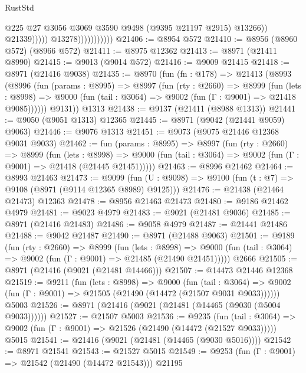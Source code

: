 \begin{lexlean}{RustStd}
\begin{coremodule}
                                        @225
                                        @27
                                        @3056
                                        @3069
                                        @3590
                                        @9498
                                        (@9395 @21197 @2915)
                                        @13266))
                                    @21339)))))
                          @13278)))))))))))
@21406 := @8954 @572
@21410 := @8956 (@8960 @572) (@8966 @572)
@21411 := @8975 @12362
@21413 := @8971 (@21411 @8990)
@21415 := @9013 (@9014 @572)
@21416 := @9009 @21415
@21418 := @8971 (@21416 @9038)
@21435 := @8970
    (fun (fn : @178) =>
    @21413
      (@8993
        (@8996
          (fun (params : @8995) =>
          @8997
            (fun (rty : @2660) =>
            @8999
              (fun (lets : @8998) =>
              @9000 (fun (tail : @3064) => @9002 (fun (Γ : @9001) => @21418 @9085))))))
        @9131))
    @1313
@21438 := @9137 (@21411 (@8988 @1313))
@21441 := @9050 (@9051 @1313) @12365
@21445 := @8971 (@9042 (@21441 @9059) @9063)
@21446 := @9076 @1313
@21451 := @9073 (@9075 @21446 @12368 @9031 @9033)
@21462 := fun (params : @8995) =>
  @8997
    (fun (rty : @2660) =>
    @8999
      (fun (lets : @8998) =>
      @9000 (fun (tail : @3064) => @9002 (fun (Γ : @9001) => @21418 (@21445 @21451)))))
@21463 := @8996 @21462
@21464 := @8993 @21463
@21473 := @9099
    (fun (U : @9098) => @9100 (fun (t : @7) => @9108 (@8971 (@9114 @12365 @8989) @9125)))
@21476 := @21438 (@21464 @21473) @12363
@21478 := @8956 @21463 @21473
@21480 := @9186 @21462 @4979
@21481 := @9023 @4979
@21483 := @9021 (@21481 @9036)
@21485 := @8971 (@21416 @21483)
@21486 := @9058 @4979
@21487 := @21441 @21486
@21488 := @9042 @21487
@21490 := @8971 (@21488 @9063)
@21501 := @9189
    (fun (rty : @2660) =>
    @8999
      (fun (lets : @8998) =>
      @9000 (fun (tail : @3064) => @9002 (fun (Γ : @9001) => @21485 (@21490 @21451)))))
    @2666
@21505 := @8971 (@21416 (@9021 (@21481 @14466)))
@21507 := @14473 @21446 @12368
@21519 := @9211
    (fun (lets : @8998) =>
    @9000
      (fun (tail : @3064) =>
      @9002 (fun (Γ : @9001) => @21505 (@21490 (@14472 (@21507 @9031 @9033))))))
    @5003
@21526 := @8971 (@21416 (@9021 (@21481 (@14465 (@9030 (@5004 @9033))))))
@21527 := @21507 @5003
@21536 := @9235
    (fun (tail : @3064) => @9002 (fun (Γ : @9001) => @21526 (@21490 (@14472 (@21527 @9033)))))
    @5015
@21541 := @21416 (@9021 (@21481 (@14465 (@9030 @5016))))
@21542 := @8971 @21541
@21543 := @21527 @5015
@21549 := @9253 (fun (Γ : @9001) => @21542 (@21490 (@14472 @21543))) @21195

\end{coremodule}
\end{lexlean}
